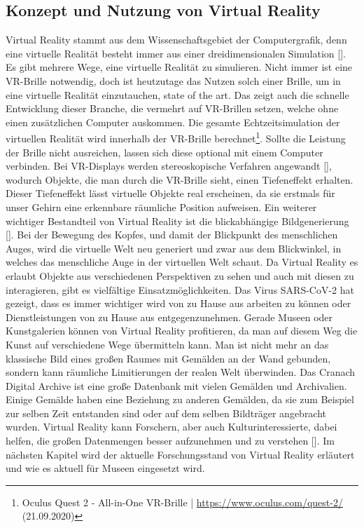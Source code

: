 \documentclass[a4paper,12pt,oneside]{article}
\begin{document}
    \subsection{Konzept und Nutzung von Virtual Reality} \label{Konzept und Nutzung von VR}
      Virtual Reality stammt aus dem Wissenschaftsgebiet der Computergrafik, denn eine
      virtuelle Realität besteht immer aus einer dreidimensionalen Simulation [\cite[13]{Dorner2013}].
      Es gibt mehrere Wege, eine virtuelle Realität zu simulieren. Nicht immer ist eine 
      VR-Brille notwendig, doch ist heutzutage das Nutzen solch einer Brille, um in eine 
      virtuelle Realität einzutauchen, state of the art. Das zeigt auch die schnelle 
      Entwicklung dieser Branche, die vermehrt auf VR-Brillen setzen, welche ohne einen
      zusätzlichen Computer auskommen. Die gesamte Echtzeitsimulation der virtuellen
      Realität wird innerhalb der VR-Brille berechnet\footnote{Oculus Quest 2 - All-in-One VR-Brille | \url{https://www.oculus.com/quest-2/} (21.09.2020)}.
      Sollte die Leistung der Brille nicht ausreichen, lassen sich diese optional mit einem
      Computer verbinden. Bei VR-Displays werden stereoskopische Verfahren angewandt [\cite[13]{Dorner2013}],
      wodurch Objekte, die man durch die VR-Brille sieht, einen Tiefeneffekt erhalten.
      Dieser Tiefeneffekt lässt virtuelle Objekte real erscheinen, da sie erstmals für unser
      Gehirn eine erkennbare räumliche Position aufweisen. Ein weiterer wichtiger
      Bestandteil von Virtual Reality ist die blickabhängige Bildgenerierung [\cite[13]{Dorner2013}].
      Bei der Bewegung des Kopfes, und damit der Blickpunkt des menschlichen Auges, wird
      die virtuelle Welt neu generiert und zwar aus dem Blickwinkel, in welches das
      menschliche Auge in der virtuellen Welt schaut. Da Virtual Reality es erlaubt Objekte
      aus verschiedenen Perspektiven zu sehen und auch mit diesen zu interagieren, gibt
      es vielfältige Einsatzmöglichkeiten. Das Virus SARS-CoV-2 hat gezeigt, dass es
      immer wichtiger wird von zu Hause aus arbeiten zu können oder Dienstleistungen von
      zu Hause aus entgegenzunehmen. Gerade Museen oder Kunstgalerien können von
      Virtual Reality profitieren, da man auf diesem Weg die Kunst auf verschiedene
      Wege übermitteln kann. Man ist nicht mehr an das klassische Bild eines großen
      Raumes mit Gemälden an der Wand gebunden, sondern kann räumliche Limitierungen der
      realen Welt überwinden. Das Cranach Digital Archive ist eine große Datenbank mit
      vielen Gemälden und Archivalien. Einige Gemälde haben eine Beziehung zu anderen 
      Gemälden, da sie zum Beispiel zur selben Zeit entstanden sind oder auf dem selben
      Bildträger angebracht wurden. Virtual Reality kann Forschern, aber auch 
      Kulturinteressierte, dabei helfen, die großen Datenmengen besser aufzunehmen und
      zu verstehen [\cite[9]{Dorner2013}]. Im nächsten Kapitel wird der aktuelle
      Forschungsstand von Virtual Reality erläutert und wie es aktuell für Museen
      eingesetzt wird.
\end{document}
